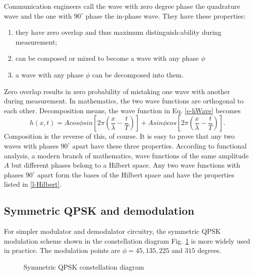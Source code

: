\documentclass[oneside, letter, 12pt]{book}
\begin{document}
Communication engineers call the wave with zero degree phase the quadrature wave and the one with $90^\circ$ phase the in-phase wave. They have these properties:
\begin{enumerate}\label{l-Hilbert}
    \item they have zero overlap and thus maximum distinguish-ability during measurement;
\item can be composed or mixed to become a wave with any phase $\phi$
\item a wave with any phase $\phi$ can be decomposed into them.
\end{enumerate}

Zero overlap results in zero probability of mistaking one wave with another during measurement. In mathematics, the two wave functions are orthogonal to each other. Decomposition means, the wave function in Eq. \ref{e-hWave} becomes
\begin{equation}\label{e-hWave}
    h(x,t) = A cos\phi sin[2\pi (\frac x \lambda - \frac t T)] + A sin\phi cos[2\pi (\frac x \lambda - \frac t T)].
\end{equation}
Composition is the reverse of this, of course. It is easy to prove that any two waves with phases $90^\circ$ apart have these three properties. According to functional analysis, a modern branch of mathematics, wave functions of the same amplitude $A$ but different phases belong to a Hilbert space. Any two wave functions with phases $90^\circ$ apart form the bases of the Hilbert space and have the properties listed in \ref{l-Hilbert}.

\subsection{Symmetric QPSK and demodulation}
For simpler modulator and demodulator circuitry, the symmetric QPSK modulation scheme shown in the constellation diagram Fig. \ref{sQPSK} is more widely used in practice. The modulation points are $\phi = 45, 135, 225$ and $315$ degrees.
\begin{figure}[h]\label{sQPSK}
\caption{Symmetric QPSK constellation diagram}
\end{figure}
\end{document}
